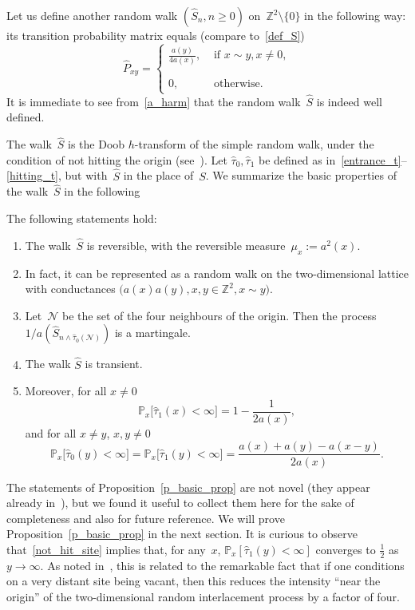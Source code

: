 \documentclass[10pt]{amsart}
\theoremstyle{definition}\newtheorem{defi}[theo]{Definition}\newtheorem{rema}[theo]{Remark}\newtheorem{exam}[theo]{Example}\newtheorem{exem}[theo]{Example}\newtheorem{nota}[theo]{Notation}
\newcommand{\1}[1]{{\mathbf 1}{\{#1\}}}
\newcommand{\Z}{\mathbb{Z}}
\newcommand{\s}{{\widehat S}}
\newcommand{\8}{{\infty}}
\newcommand{\IP}{{\mathbb P}}
\newcommand{\hP}{\widehat{P}}
\newcommand{\htau}{\widehat{\tau}}
\begin{document}
Let us define another random walk $(\s_n, n\geq 0)$ on~$\Z^2\setminus \{0\}$ in the following way: its transition probability matrix equals (compare to~\eqref{def_S})
\begin{equation}\label{def_hatS}
\hP_{xy} =
\begin{cases}
\displaystyle\frac{a(y)}{4a(x)}, & \text{ if } x\sim y, x\neq 0,\\
0,\phantom{\int\limits^A} & \text{ otherwise.}
\end{cases}
\end{equation}
It is immediate to see from~\eqref{a_harm} that the random walk~$\s$ is indeed well defined.

The walk~$\s$ is the Doob $h$-transform of the simple random walk, under the condition of not hitting the origin (see~\cite[Lemma~3.3 and its proof]{CPV16}). Let $\htau_0, \htau_1$ be defined as in~\eqref{entrance_t}--\eqref{hitting_t}, but with~$\s$ in the place of~$S$. We summarize the basic properties of the walk~$\s$ in the following

\begin{prop}\label{p_basic_prop}
The following statements hold:
\begin{enumerate}
\item \label{1.1.1} The walk~$\s$ is reversible, with the reversible measure~$\mu_x:=a^2(x)$.
\item \label{1.1.2} In fact, it can be represented as a random walk on the two-dimensional lattice with conductances $\big(a(x)a(y), x,y\in \Z^2, x\sim y\big)$.
\item \label{1.1.3} Let~$\mathcal{N}$ be the set of the four neighbours of the origin. Then the process $1/a(\s_{n\wedge \htau_0(\mathcal{N})})$ is a martingale.
\item \label{1.1.4} The walk $\s$ is transient.
\item \label{1.1.5} Moreover, for all $x\neq 0$
\begin{equation}\label{escape_from_site}
\IP_x\big[\htau_1(x)<\infty\big] = 1-\frac{1}{2a(x)},
\end{equation}
and for all $x\neq y$, $x,y\neq 0$
\begin{equation}\label{not_hit_site}
\IP_x\big[\htau_0(y)<\infty\big] =
\IP_x\big[\htau_1(y)<\infty\big] = \frac{a(x)+a(y)-a(x-y)}{2a(x)}.
\end{equation}
\end{enumerate}
\end{prop}

The statements of Proposition~\ref{p_basic_prop} are not novel (they appear already in~\cite{CPV16}), but we found it useful to collect them here for the sake of completeness and also for future reference. We will prove Proposition~\ref{p_basic_prop} in the next section. It is curious to observe that~\eqref{not_hit_site} implies that, for any~$x$, $\IP_x[\htau_1(y)<\infty]$ converges to $\frac{1}{2}$ as $y\to \infty$. As noted in~\cite{CPV16}, this is related to the remarkable fact that if one conditions on a very distant site being vacant, then this reduces the intensity ``near the origin'' of the two-dimensional random interlacement process by a factor of four.
\end{document}
